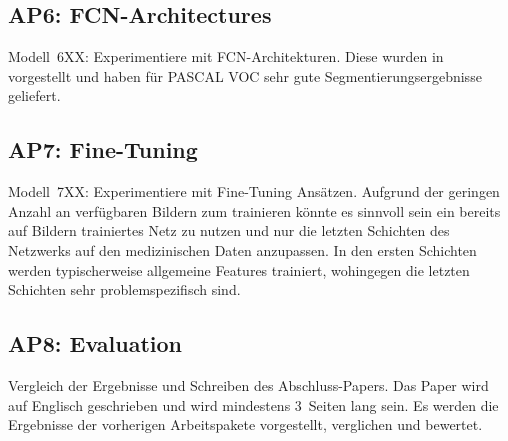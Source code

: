 \clearpage
\subsection{AP6: FCN-Architectures}
Modell~6XX: Experimentiere mit FCN-Architekturen. Diese wurden
in~\cite{long2015fully} vorgestellt und haben für PASCAL VOC sehr gute
Segmentierungsergebnisse geliefert.


\subsection{AP7: Fine-Tuning}
Modell~7XX: Experimentiere mit Fine-Tuning Ansätzen. Aufgrund der geringen
Anzahl an verfügbaren Bildern zum trainieren könnte es sinnvoll sein ein
bereits auf Bildern trainiertes Netz zu nutzen und nur die letzten Schichten
des Netzwerks auf den medizinischen Daten anzupassen. In den ersten Schichten
werden typischerweise allgemeine Features trainiert, wohingegen die letzten
Schichten sehr problemspezifisch sind.


\subsection{AP8: Evaluation}
Vergleich der Ergebnisse und Schreiben des Abschluss-Papers. Das Paper wird
auf Englisch geschrieben und wird mindestens 3~Seiten lang sein. Es werden
die Ergebnisse der vorherigen Arbeitspakete vorgestellt, verglichen und
bewertet.